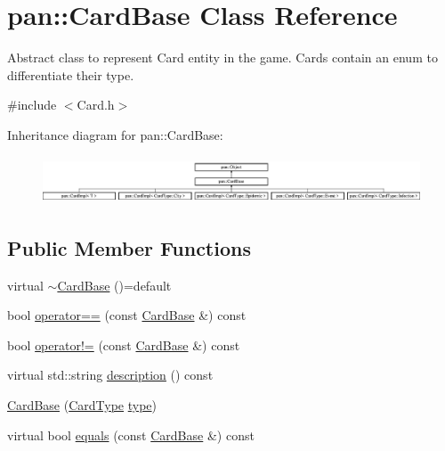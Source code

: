 \hypertarget{classpan_1_1_card_base}{}\section{pan\+:\+:Card\+Base Class Reference}
\label{classpan_1_1_card_base}


Abstract class to represent Card entity in the game. Cards contain an enum to differentiate their type.  




{\ttfamily \#include $<$Card.\+h$>$}

Inheritance diagram for pan\+:\+:Card\+Base\+:\begin{figure}[H]
\begin{center}
\leavevmode
\includegraphics[height=1.435897cm]{classpan_1_1_card_base}
\end{center}
\end{figure}
\subsection*{Public Member Functions}
\begin{DoxyCompactItemize}
\item 
virtual \hyperlink{classpan_1_1_card_base_a85b2e83d4d62dad2f43a91277cbdf974}{$\sim$\+Card\+Base} ()=default
\item 
bool \hyperlink{classpan_1_1_card_base_a21cc5a1c879b848d21d2a579cfcadd19}{operator==} (const \hyperlink{classpan_1_1_card_base}{Card\+Base} \&) const
\item 
bool \hyperlink{classpan_1_1_card_base_a2f71f627f9f4b04fbe0982667a513728}{operator!=} (const \hyperlink{classpan_1_1_card_base}{Card\+Base} \&) const
\item 
virtual std\+::string \hyperlink{classpan_1_1_card_base_ad004c502404a958eaf4ecae7e73cc8cf}{description} () const
\item 
\hyperlink{classpan_1_1_card_base_afdca48b95924340316fd8a0a0a784330}{Card\+Base} (\hyperlink{namespacepan_a1f7350bfd0421afeabe9fa95c16fa811}{Card\+Type} \hyperlink{classpan_1_1_card_base_a47c25b9584c70305e862fcab7d0212ee}{type})
\item 
virtual bool \hyperlink{classpan_1_1_card_base_aaf967cee010ef974699da8502834e0e6}{equals} (const \hyperlink{classpan_1_1_card_base}{Card\+Base} \&) const
\end{DoxyCompactItemize}
